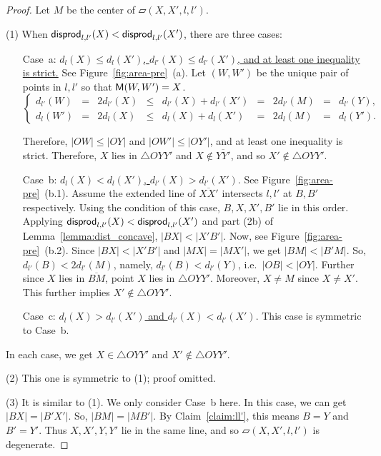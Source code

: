 \documentclass{ws-ijcga}
\begin{document}
\begin{proof}
Let $M$ be the center of $\parallelogram(X,X',l,l')$.

(1) When $\mathsf{disprod}_{l,l'}(X)<\mathsf{disprod}_{l,l'}(X')$, there are three cases:
\begin{enumerate}
\item[Case~a:] \underline{$d_l(X)\leq d_l(X')$, $d_{l'}(X)\leq d_{l'}(X')$, and at least one inequality is strict.}
    See Figure~\ref{fig:area-pre}~(a).
    Let $(W,W')$ be the unique pair of points in $l,l'$ so that $\mathsf{M}(W,W')=X$.
    $
    \left\{\begin{array}{ccccccccc}
    d_{l'}(W) &=&2d_{l'}(X) &\leq & d_{l'}(X)+d_{l'}(X') &= &2d_{l'}(M)&=&d_{l'}(Y),\\
    d_l(W')   &=&2d_l(X)    &\leq & d_l(X)+d_l(X') &= &2d_l(M)&=&d_l(Y').
    \end{array}\right.
    $

    Therefore, $|OW|\leq |OY|$ and $|OW'|\leq |OY'|$, and at least one inequality is strict.
    Therefore, $X$ lies in $\triangle OYY'$ and $X\notin \overline{YY'}$, and so $X'\notin \triangle OYY'$. \smallskip

\item[Case~b:] \underline{$d_l(X)< d_l(X')$, $d_{l'}(X)>d_{l'}(X')$}. See Figure~\ref{fig:area-pre}~(b.1).
    Assume the extended line of $\overline{XX'}$ intersects $l,l'$ at $B,B'$ respectively.
    Using the condition of this case, $B,X,X',B'$ lie in this order.
    Applying $\mathsf{disprod}_{l,l'}(X)<\mathsf{disprod}_{l,l'}(X')$ and part (2b) of Lemma~\ref{lemma:dist_concave}, $|BX|<|X'B'|$.
    Now, see Figure~\ref{fig:area-pre}~(b.2). Since $|BX|<|X'B'|$ and $|MX|=|MX'|$, we get $|BM|<|B'M|$.
    So, $d_{l'}(B)<2d_{l'}(M)$, namely, $d_{l'}(B)<d_{l'}(Y)$, i.e.\ $|OB|<|OY|$.
    Further since $X$ lies in $\overline{BM}$, point $X$ lies in $\triangle OYY'$.
    Moreover, $X\neq M$ since $X\neq X'$. This further implies $X'\notin \triangle OYY'$. \smallskip

\item[Case~c:] \underline{$d_l(X)>d_{l'}(X')$ and $d_{l'}(X)< d_{l'}(X')$}. This case is symmetric to Case~b.
\end{enumerate}

In each case, we get $X\in \triangle OYY'$ and $X'\notin \triangle OYY'$.

\smallskip\noindent (2) This one is symmetric to (1); proof omitted.

\smallskip \noindent (3) It is similar to (1). We only consider Case~b here.
    In this case, we can get $|BX|=|B'X'|$. So, $|BM|=|MB'|$.
    By Claim~\ref{claim:ll'}, this means $B=Y$ and $B'=Y'$. Thus $X,X',Y,Y'$ lie in the same line, and so $\parallelogram(X,X',l,l')$ is degenerate.
 \end{proof}
\end{document}
